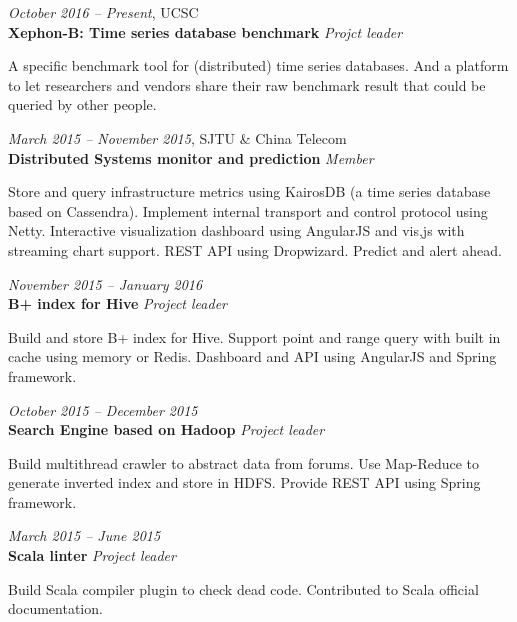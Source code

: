 \documentclass[fontsize=10pt]{tccv}
\begin{document}
\begin{eventlist}

\textit{October 2016 -- Present}, UCSC \\
\textbf{Xephon-B: Time series database benchmark} \textit{Projct leader}\smallskip

A specific benchmark tool for (distributed) time series databases.
And a platform to let researchers and vendors share their raw benchmark result that
could be queried by other people.

\textit{March 2015 -- November 2015}, SJTU \& China Telecom \\
\textbf{Distributed Systems monitor and prediction} \textit{Member}\smallskip

Store and query infrastructure metrics using KairosDB (a time series database based on Cassendra).
Implement internal transport and control protocol using Netty.
Interactive visualization dashboard using AngularJS and vis,js with streaming chart support.
REST API using Dropwizard. Predict and alert ahead.

\medskip

\textit{November 2015 -- January 2016} \\
\textbf{B+ index for Hive} \textit{Project leader}\smallskip

Build and store B+ index for Hive.
Support point and range query with built in cache using memory or Redis.
Dashboard and API using AngularJS and Spring framework.

\medskip

\textit{October 2015 -- December 2015} \\
\textbf{Search Engine based on Hadoop} \textit{Project leader}\smallskip

Build multithread crawler to abstract data from forums.
Use Map-Reduce to generate inverted index and store in HDFS.
Provide REST API using Spring framework.

\medskip

\textit{March 2015 -- June 2015} \\
\textbf{Scala linter} \textit{Project leader}\smallskip

Build Scala compiler plugin to check dead code.
Contributed to Scala official documentation.

\medskip



\end{eventlist}
\end{document}
